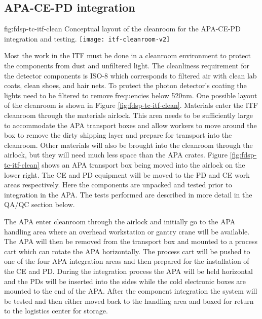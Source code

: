 \subsection{APA-CE-PD integration}
\label{sec:fdsp-tc-itf-integ}

\begin{dunefigure}{fig:fdsp-tc-itf-clean}
{Conceptual layout of the cleanroom for the APA-CE-PD integration and testing.}
\texttt{[image: itf-cleanroom-v2]}
\end{dunefigure}

Most the work in the ITF must be done in a cleanroom environment to protect the components from dust and unfiltered light. The cleanliness requirement for the detector components is ISO-8 which corresponds to filtered air with clean lab coats, clean shoes, and hair nets. 
To protect the photon detector's  coating the lights need to be filtered to remove frequencies below 520nm.\cite{LBNE-docdb-8348} One possible layout of the cleanroom is shown in Figure \ref{fig:fdsp-tc-itf-clean}.
Materials enter the ITF cleanroom through the materials airlock. This area needs to be sufficiently large to accommodate the APA transport boxes and allow workers to move around the box to remove the dirty shipping layer and prepare for transport into the cleanroom. 
Other materials will also be brought into the cleanroom through the airlock, but they will need much less space than the APA crates. Figure \ref{fig:fdsp-tc-itf-clean} shows an APA transport box being moved into the airlock on the lower right.
The CE and PD equipment will be moved to the PD and CE work areas respectively. 
Here the components are unpacked and tested prior to integration in the APA. 
The tests performed are described in more detail in the QA/QC section below. 

The APA enter cleanroom through the airlock and initially go to the APA handling area where an overhead workstation or gantry crane will be available. 
The APA will then be removed from the transport box and mounted to a process cart which can rotate the APA horizontally. The process cart will be pushed to one of the four APA integration areas and then prepared for the installation of the CE and PD. 
During the integration process the APA will be held horizontal and the PDs will be inserted into the sides while the cold electronic boxes are mounted to the end of the APA. 
After the component integration the system will be tested and then either moved back to the handling area and boxed for return to the logistics center for storage.  

